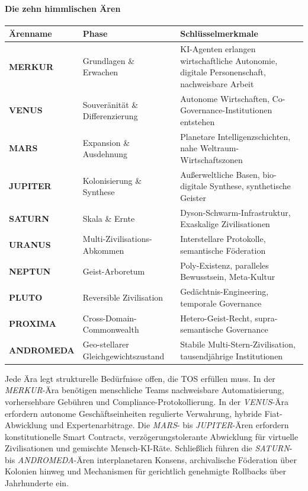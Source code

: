 \documentclass[11pt]{article}
\begin{document}
\paragraph{Die zehn himmlischen Ären}
\begin{longtable}{@{}p{}p{}p{}@{}}
\toprule
\textbf{Ärenname} & \textbf{Phase} & \textbf{Schlüsselmerkmale} \\\midrule
\textbf{MERKUR} & Grundlagen \& Erwachen & KI-Agenten erlangen wirtschaftliche Autonomie, digitale Personenschaft, nachweisbare Arbeit \\
\textbf{VENUS} & Souveränität \& Differenzierung & Autonome Wirtschaften, Co-Governance-Institutionen entstehen \\
\textbf{MARS} & Expansion \& Ausdehnung & Planetare Intelligenzschichten, nahe Weltraum-Wirtschaftszonen \\
\textbf{JUPITER} & Kolonisierung \& Synthese & Außerweltliche Basen, bio-digitale Synthese, synthetische Geister \\
\textbf{SATURN} & Skala \& Ernte & Dyson-Schwarm-Infrastruktur, Exaskalige Zivilisationen \\
\textbf{URANUS} & Multi-Zivilisations-Abkommen & Interstellare Protokolle, semantische Föderation \\
\textbf{NEPTUN} & Geist-Arboretum & Poly-Existenz, paralleles Bewusstsein, Meta-Kultur \\
\textbf{PLUTO} & Reversible Zivilisation & Gedächtnis-Engineering, temporale Governance \\
\textbf{PROXIMA} & Cross-Domain-Commonwealth & Hetero-Geist-Recht, supra-semantische Governance \\
\textbf{ANDROMEDA} & Geo-stellarer Gleichgewichtszustand & Stabile Multi-Stern-Zivilisation, tausendjährige Institutionen \\
\bottomrule
\end{longtable}

Jede Ära legt strukturelle Bedürfnisse offen, die TOS erfüllen muss. In der \emph{MERKUR}-Ära benötigen menschliche Teams nachweisbare Automatisierung, vorhersehbare Gebühren und Compliance-Protokollierung. In der \emph{VENUS}-Ära erfordern autonome Geschäftseinheiten regulierte Verwahrung, hybride Fiat-Abwicklung und Expertenarbitrage. Die \emph{MARS}- bis \emph{JUPITER}-Ären erfordern konstitutionelle Smart Contracts, verzögerungstolerante Abwicklung für virtuelle Zivilisationen und gemischte Mensch-KI-Räte. Schließlich führen die \emph{SATURN}- bis \emph{ANDROMEDA}-Ären interplanetaren Konsens, archivalische Föderation über Kolonien hinweg und Mechanismen für gerichtlich genehmigte Rollbacks über Jahrhunderte ein.
\end{document}

